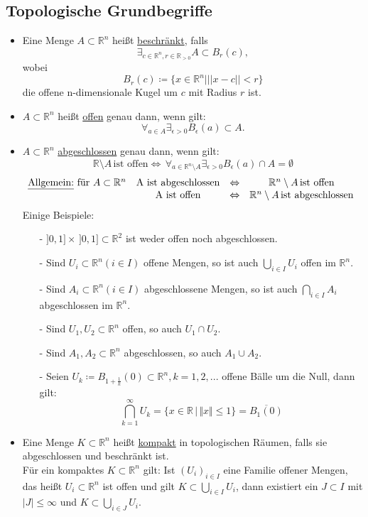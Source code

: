 \subsection{Topologische Grundbegriffe}
\begin{itemize}
	\item Eine Menge $A \subset \mathbb{R}^n$ heißt \underline{beschränkt}, falls
	\[\exists_{c \in \mathbb{R}^n, r \in \mathbb{R}_{>0}} A \subset B_r(c),\] wobei \[B_r(c)\coloneqq \{x \in \mathbb{R}^n| ||x-c|| < r\}\] die offene n-dimensionale Kugel um $c$ mit Radius $r$ ist.
	\item $A \subset \mathbb{R}^n$ heißt \underline{offen} genau dann, wenn gilt:
	\[\forall_{a \in A} \exists_{\epsilon > 0} B_{\epsilon}(a) \subset A.\]
	\item $A \subset \mathbb{R}^n$ \underline{abgeschlossen} genau dann, wenn gilt:
	\[\mathbb{R} \setminus A \, \textrm{ist offen} \Leftrightarrow \, \forall_{a \in \mathbb{R}^n \setminus A} \exists_{\epsilon > 0} B_{\epsilon}(a) \cap A = \emptyset\]
	\begin{equation*}
		\begin{matrix}
		\textrm{\underline{Allgemein:} für } A \subset \mathbb{R}^n & \textrm{A ist abgeschlossen} & \Leftrightarrow & \mathbb{R}^n \setminus A \, \textrm{ist offen}\\
		& \textrm{A ist offen} & \Leftrightarrow & \mathbb{R}^n \setminus A \, \textrm{ist abgeschlossen}
		\end{matrix}\\
	\end{equation*}
	Einige Beispiele:
	\begin{itemize}
		\item[-] $]0,1] \times \,]0,1] \subset \mathbb{R}^2$ ist weder offen noch abgeschlossen.
		\item[-] Sind $U_i \subset \mathbb{R}^n (i \in I)$ offene Mengen, so ist auch $\bigcup_{i \in I} U_i$ offen im $\mathbb{R}^n$.
		\item[-] Sind $A_i \subset \mathbb{R}^n (i \in I)$ abgeschlossene Mengen, so ist auch $\bigcap_{i \in I} A_i$ abgeschlossen im $\mathbb{R}^n$.
		\item[-] Sind $U_1, U_2 \subset \mathbb{R}^n$ offen, so auch $U_1 \cap U_2$.
		\item[-] Sind $A_1, A_2 \subset \mathbb{R}^n$ abgeschlossen, so auch $A_1 \cup A_2$.
		\item[-] Seien $U_k\coloneqq B_{1+\frac{1}{k}} (0) \subset \mathbb{R}^n, k=1,2,...$ offene Bälle um die Null, dann gilt:
		\[\bigcap_{k=1}^\infty U_k = \{x \in \mathbb{R}\, |\, \Vert x\Vert \leq 1\} = \overline{B_1(0)}\]
	\end{itemize}
	\item Eine Menge $K \subset \mathbb{R}^n$ heißt \underline{kompakt} in topologischen Räumen, falls sie abgeschlossen und beschränkt ist.\\
	Für  ein kompaktes $K \subset \mathbb{R}^n$ gilt: Ist $(U_i)_{i \in I}$ eine Familie offener Mengen, das heißt $U_i \subset \mathbb{R}^n$ ist offen und gilt $K \subset \bigcup_{i \in I} U_i$, dann existiert ein $J \subset I$ mit $|J| \le \infty$ und $K \subset \bigcup_{i \in J} U_i$.\\
	

\end{itemize}
